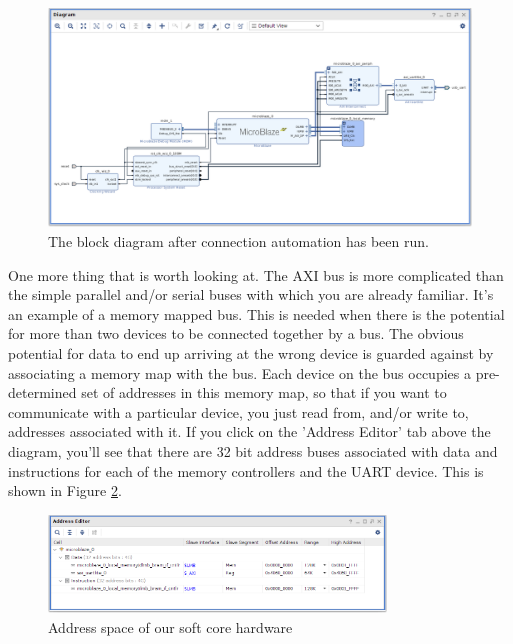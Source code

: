 \documentclass[../physical_computing.tex]{subfiles}
\begin{document}
\begin{figure}[h!]
    \centering
    \includegraphics[width=\textwidth]{figures/afterconnectionautomation.png}
    \caption{The block diagram after connection automation has been run.}
    \label{fig:afterconnectionautomation}
\end{figure}

One more thing that is worth looking at. The AXI bus is more complicated than the simple parallel and/or serial buses with which you
are already familiar. It's an example of a memory mapped bus. This is needed when there is the potential for more than two devices
to be connected together by a bus. The obvious potential for data to end up arriving at the wrong device is guarded against by
associating a memory map with the bus. Each device on the bus occupies a pre-determined set of addresses in this memory map, so that
if you want to communicate with a particular device, you just read from, and/or write to, addresses associated with it. If you 
click on the 'Address Editor' tab above the diagram, you'll see that there are 32 bit address buses associated with data and 
instructions for each of the memory controllers and the UART device. This is shown in Figure \ref{fig:memorymap}.

\begin{figure}[h!]
    \centering
    \includegraphics[width=0.8\textwidth]{figures/memorymap.png}
    \caption{Address space of our soft core hardware}
    \label{fig:memorymap}
\end{figure}
\end{document}
